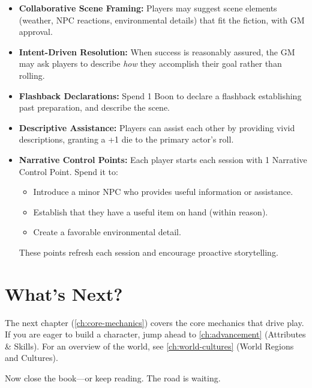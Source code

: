 \begin{itemize}
\item \textbf{Collaborative Scene Framing:} Players may suggest scene elements (weather, NPC reactions, environmental details) that fit the fiction, with GM approval.
\item \textbf{Intent-Driven Resolution:} When success is reasonably assured, the GM may ask players to describe \emph{how} they accomplish their goal rather than rolling.
\item \textbf{Flashback Declarations:} Spend 1 Boon to declare a flashback establishing past preparation, and describe the scene.
\item \textbf{Descriptive Assistance:} Players can assist each other by providing vivid descriptions, granting a +1 die to the primary actor's roll.
\item \textbf{Narrative Control Points:} Each player starts each session with 1 Narrative Control Point. Spend it to:
\begin{itemize}
\item Introduce a minor NPC who provides useful information or assistance.
\item Establish that they have a useful item on hand (within reason).
\item Create a favorable environmental detail.
\end{itemize}
These points refresh each session and encourage proactive storytelling.
\end{itemize}

\section*{What's Next?}

The next chapter (\autoref{ch:core-mechanics}) covers the core mechanics that drive play. If you are eager to build a character, jump ahead to \autoref{ch:advancement} (Attributes \& Skills). For an overview of the world, see \autoref{ch:world-cultures} (World Regions and Cultures).

Now close the book---or keep reading. The road is waiting.